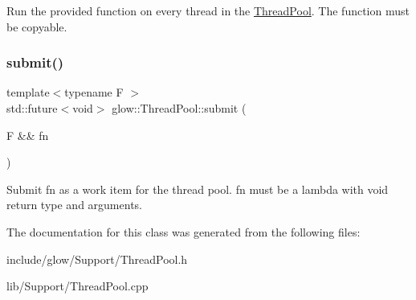 Run the provided function on every thread in the \hyperlink{classglow_1_1_thread_pool}{Thread\+Pool}. The function must be copyable. \mbox{\label{classglow_1_1_thread_pool_a3ec94a4373c5a4380c28d75bfb61e3ac}} 
\subsubsection{\texorpdfstring{submit()}{submit()}}
{\footnotesize\ttfamily template$<$typename F $>$ \\
std\+::future$<$void$>$ glow\+::\+Thread\+Pool\+::submit (\begin{DoxyParamCaption}\item[{F \&\&}]{fn }\end{DoxyParamCaption})\hspace{0.3cm}{\ttfamily [inline]}}

Submit {\ttfamily fn} as a work item for the thread pool. {\ttfamily fn} must be a lambda with void return type and arguments. 

The documentation for this class was generated from the following files\+:\begin{DoxyCompactItemize}
\item 
include/glow/\+Support/Thread\+Pool.\+h\item 
lib/\+Support/Thread\+Pool.\+cpp\end{DoxyCompactItemize}
